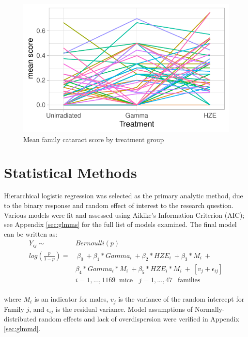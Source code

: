 \documentclass[12pt]{article}
\begin{document}
\begin{figure}[H]

{\centering \includegraphics{bookdown_report_files/figure-latex/lineeda-1} 

}

\caption{Mean family cataract score by treatment group}\label{fig:lineeda}
\end{figure}

\section{Statistical Methods}
\label{sec:methods}

Hierarchical logistic regression was selected as the primary analytic method, due to the binary response and random effect of interest to the research question. Various models were fit and assessed using Aikike's Information Criterion (AIC); see Appendix \ref{sec:glmms} for the full list of models examined. The final model can be written as:\\
\begin{equation}
\begin{aligned}
Y_{ij} \sim &Bernoulli(p) \\
log(\frac{p}{1-p}) = &\ \beta_0\ +\beta_1*Gamma_i\ + \beta_2*HZE_i\ + \beta_3*M_i\ + \\ &\beta_4*Gamma_i*M_i\ + \beta_5*HZE_i*M_i\ +\ [v_{j} + \epsilon_{ij}] \\
&i = 1, ..., 1169\ \mbox{ mice}\ \ \ \ j = 1,...,47\ \ \mbox{ families}
\end{aligned}
\label{eq:glmm}
\end{equation}\\
where \(M_i\) is an indicator for males, \(v_{j}\) is the variance of the random intercept for Family \(j\), and \(\epsilon_{ij}\) is the residual variance. Model assumptions of Normally-distributed random effects and lack of overdispersion were verified in Appendix \ref{sec:glmmd}.
\end{document}
